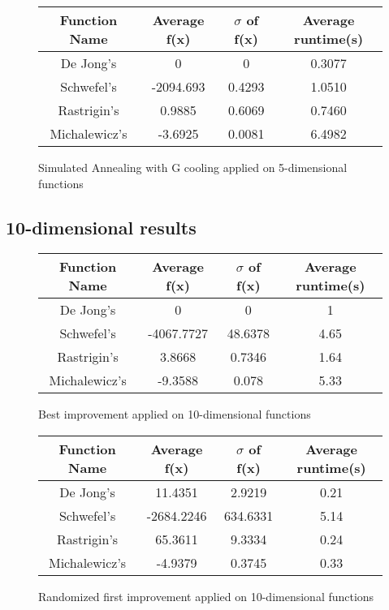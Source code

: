 \documentclass{article}
\begin{document}
\begin{figure}[H]
    \begin{tabular}{|c||c|c|c|} \hline
        Function Name & Average f(x) & $\sigma$ of f(x) & Average runtime(s) \\ \hline \hline
        De Jong's & 0 & 0 & 0.3077 \\ \hline
        Schwefel's & -2094.693 & 0.4293 & 1.0510 \\ \hline
        Rastrigin's & 0.9885 & 0.6069 & 0.7460 \\ \hline
        Michalewicz's & -3.6925 & 0.0081 & 6.4982 \\ \hline
    \end{tabular}
    \caption{Simulated Annealing with G cooling applied on 5-dimensional functions}
    \end{figure}

\subsection{10-dimensional results}

\begin{figure}[H]
\begin{tabular}{|c||c|c|c|} \hline
	Function Name & Average f(x) & $\sigma$ of f(x) & Average runtime(s) \\ \hline \hline
	De Jong's & 0 & 0 & 1 \\ \hline
	Schwefel's & -4067.7727 & 48.6378 & 4.65 \\ \hline
	Rastrigin's & 3.8668 & 0.7346 & 1.64 \\ \hline
	Michalewicz's & -9.3588 & 0.078 & 5.33 \\ \hline
\end{tabular}
\caption{Best improvement applied on 10-dimensional functions}
\end{figure}

\begin{figure}[H]
\begin{tabular}{|c||c|c|c|} \hline
	Function Name & Average f(x) & $\sigma$ of f(x) & Average runtime(s) \\ \hline \hline
	De Jong's & 11.4351 & 2.9219 & 0.21 \\ \hline
	Schwefel's & -2684.2246 & 634.6331 & 5.14 \\ \hline
	Rastrigin's & 65.3611 & 9.3334 & 0.24 \\ \hline
	Michalewicz's & -4.9379 & 0.3745 & 0.33 \\ \hline
\end{tabular}
\caption{Randomized first improvement applied on 10-dimensional functions}
\end{figure}
\end{document}
